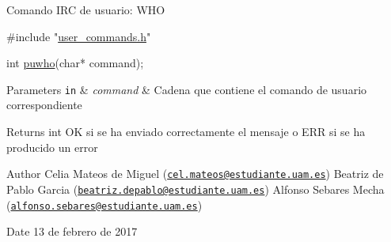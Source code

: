 Comando I\-R\-C de usuario\-: W\-H\-O


\begin{DoxyCode}
\textcolor{preprocessor}{#include "\hyperlink{user__commands_8h}{user\_commands.h}"}

\textcolor{keywordtype}{int} \hyperlink{user__commands_8h_aef4e57bf112f9c4a2d51b1a314df0b63}{puwho}(\textcolor{keywordtype}{char}* command);
\end{DoxyCode}



\begin{DoxyParams}[1]{Parameters}
\mbox{\tt in}  & {\em command} & Cadena que contiene el comando de usuario correspondiente\\
\hline
\end{DoxyParams}
\begin{DoxyReturn}{Returns}
int O\-K si se ha enviado correctamente el mensaje o E\-R\-R si se ha producido un error
\end{DoxyReturn}
\begin{DoxyAuthor}{Author}
Celia Mateos de Miguel (\href{mailto:cel.mateos@estudiante.uam.es}{\tt cel.\-mateos@estudiante.\-uam.\-es}) Beatriz de Pablo Garcia (\href{mailto:beatriz.depablo@estudiante.uam.es}{\tt beatriz.\-depablo@estudiante.\-uam.\-es}) Alfonso Sebares Mecha (\href{mailto:alfonso.sebares@estudiante.uam.es}{\tt alfonso.\-sebares@estudiante.\-uam.\-es})
\end{DoxyAuthor}
\begin{DoxyDate}{Date}
13 de febrero de 2017
\end{DoxyDate}


 